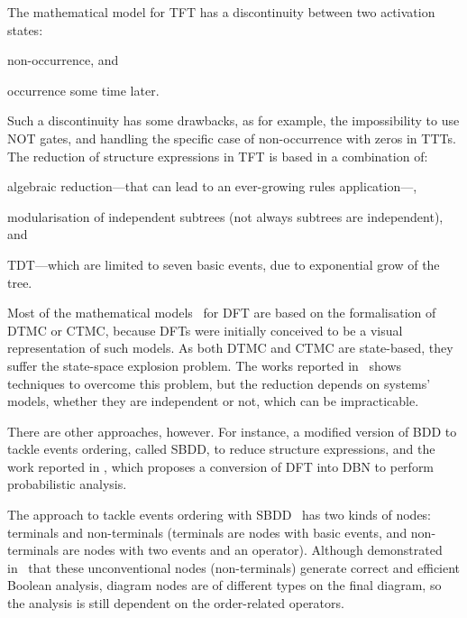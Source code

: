 \documentclass[12pt,openright,twoside,a4paper,oldfontcommands,english,brazil,draft]{abntex2}
\theoremstyle{theo}
\begin{document}
The mathematical model for \ac{TFT} has a discontinuity between two activation states:
\begin{alineasinline}
  \item non-occurrence, and
  \item occurrence some time later.
\end{alineasinline}
Such a discontinuity has some drawbacks, as for example, the impossibility to use \ac{NOT} gates, and handling the specific case of non-occurrence with zeros in \acp{TTT}.
The reduction of structure expressions in \ac{TFT} is based in a combination of:
\begin{alineasinline}
  \item algebraic reduction---that can lead to an ever-growing rules application---,
  \item modularisation of independent subtrees (not always subtrees are independent), and
  \item \ac{TDT}---which are limited to seven basic events, due to exponential grow of the tree.
\end{alineasinline}


\begin{sloppypar}
Most of the mathematical models~\cite{LHT2013,CSD2000,BRM+2005} for \ac{DFT} are based on the formalisation of \ac{DTMC} or \ac{CTMC}, because \acp{DFT} were initially conceived to be a visual representation of such models.
As both \ac{DTMC} and \ac{CTMC} are state-based, they suffer the state-space explosion problem.
The works reported in~\cite{BKK+2003,BHH+2003,SAE1996b} shows techniques to overcome this problem, but the reduction depends on systems' models, whether they are independent or not, which can be impracticable.
\end{sloppypar}

There are other approaches, however.
For instance, a modified version of \ac{BDD} to tackle events ordering, called \acf{SBDD}, to reduce structure expressions, and the work reported in \cite{BRM+2005}, which proposes a conversion of \ac{DFT} into \ac{DBN} to perform probabilistic analysis.

The approach to tackle events ordering with \ac{SBDD}~\cite{XTD2012} has two kinds of nodes: terminals and non-terminals (terminals are nodes with basic events, and non-terminals are nodes with two events and an operator).
Although demonstrated in~\cite{Bryant1986} that these unconventional nodes (non-terminals) generate correct and efficient Boolean analysis, diagram nodes are of different types on the final diagram, so the analysis is still dependent on the order-related operators.
\end{document}
